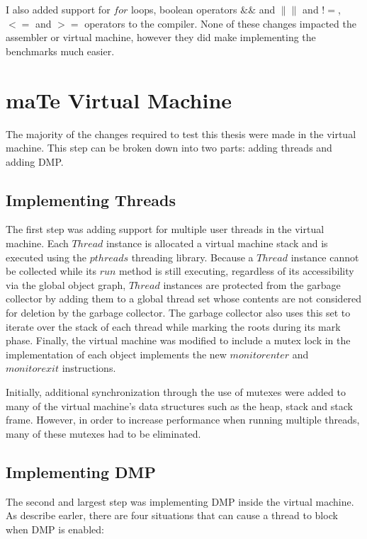 I also added support for $for$ loops, boolean operators $\&\&$ and
$\|\|$ and $!=$, $<=$ and $>=$ operators to the compiler.  None of
these changes impacted the assembler or virtual machine, however they
did make implementing the benchmarks much easier.

\section{maTe Virtual Machine}

The majority of the changes required to test this thesis were made in
the virtual machine.  This step can be broken down into two parts:
adding threads and adding DMP.

\subsection{Implementing Threads}

The first step was adding support for multiple user threads in the
virtual machine.  Each $Thread$ instance is allocated a virtual
machine stack and is executed using the $pthreads$ threading library.
Because a $Thread$ instance cannot be collected while its $run$ method
is still executing, regardless of its accessibility via the global
object graph, $Thread$ instances are protected from the garbage
collector by adding them to a global thread set whose contents are not
considered for deletion by the garbage collector.  The garbage
collector also uses this set to iterate over the stack of each thread
while marking the roots during its mark phase.  Finally, the virtual
machine was modified to include a mutex lock in the implementation of
each object implements the new $monitorenter$ and $monitorexit$
instructions.

Initially, additional synchronization through the use of mutexes were
added to many of the virtual machine's data structures such as the
heap, stack and stack frame.  However, in order to increase
performance when running multiple threads, many of these mutexes had
to be eliminated.

\subsection{Implementing DMP}

The second and largest step was implementing DMP inside the virtual
machine.  As describe earler, there are four situations that can cause
a thread to block when DMP is enabled:

